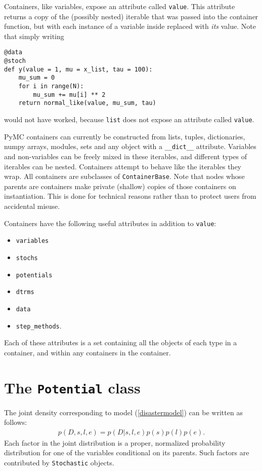 Containers, like variables, expose an attribute called \texttt{value}. This attribute returns a copy of the (possibly nested) iterable that was passed into the container function, but with each instance of a variable inside replaced with \emph{its} value. Note that simply writing
\begin{verbatim}
@data
@stoch
def y(value = 1, mu = x_list, tau = 100):
    mu_sum = 0
    for i in range(N):
        mu_sum += mu[i] ** 2
    return normal_like(value, mu_sum, tau)
\end{verbatim}
would not have worked, because \texttt{list} does not expose an attribute called \texttt{value}.

PyMC containers can currently be constructed from lists, tuples, dictionaries, numpy arrays, modules, sets and any object with a \texttt{\_\_dict\_\_} attribute. Variables and non-variables can be freely mixed in these iterables, and different types of iterables can be nested. Containers attempt to behave like the iterables they wrap. All containers are subclasses of \texttt{ContainerBase}. Note that nodes whose parents are containers make private (shallow) copies of those containers on instantiation. This is done for technical reasons rather than to protect users from accidental misuse.

Containers have the following useful attributes in addition to \texttt{value}:
\begin{itemize}
    \item\texttt{variables}
    \item\texttt{stochs}
    \item\texttt{potentials}
    \item\texttt{dtrms}
    \item\texttt{data}
    \item\texttt{step_methods}.
\end{itemize}
Each of these attributes is a set containing all the objects of each type in a container, and within any containers in the container.

\section{The \texttt{Potential} class}


The joint density corresponding to model (\ref{disastermodel}) can be written as follows:
\begin{eqnarray*}
    p(D,s,l,e) = p(D|s,l,e) p(s) p(l) p(e).
\end{eqnarray*}
Each factor in the joint distribution is a proper, normalized probability distribution for one of the variables conditional on its parents. Such factors are contributed by \texttt{Stochastic} objects.

